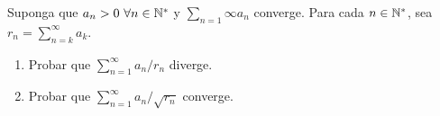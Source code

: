 
Suponga que $a_n>0\ \forall n\in\mathbb{N}^*$ y $\sum_{n=1}{\infty}{a_n}$ converge. Para cada $n\in\mathbb{N}^*$, sea $r_n=\sum_{n=k}^{\infty}{a_k}$.

\begin{enumerate}
	\item Probar que $\sum_{n=1}^{\infty}{a_n/r_n}$ diverge.
	\item Probar que $\sum_{n=1}^{\infty}{a_n/\sqrt{r_n}}$ converge.
\end{enumerate}